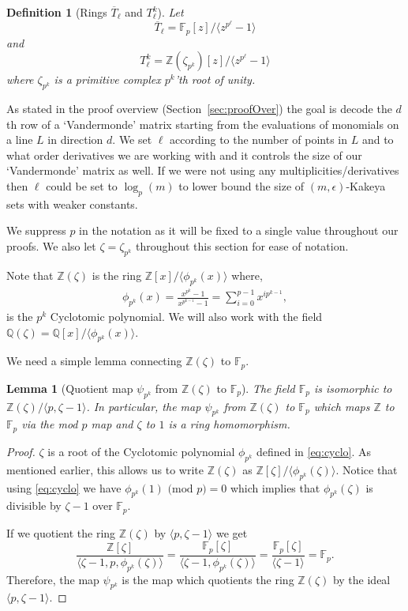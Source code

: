 \documentclass[11pt]{article}
\numberwithin{equation}{section}
\newtheorem{lem}[thm]{Lemma}
\newtheorem{define}[thm]{Definition}
\def\F{{\mathbb{F}}}
\def\Q{{\mathbb{Q}}}
\def\Z{{\mathbb{Z}}}
\begin{document}
\begin{define}[Rings $\overline{T}_{\ell}$ and $T_{\ell}^k$]
Let 
$$\overline{T}_{\ell}=\F_p[z]/\langle z^{p^\ell}-1\rangle$$ 
and 
$$T_{\ell}^k=\Z(\zeta_{p^k})[z]/\langle z^{p^\ell} -1\rangle$$
where $\zeta_{p^k}$ is a primitive complex $p^k$'th root of unity.
\end{define}

As stated in the proof overview (Section~\ref{sec:proofOver}) the goal is decode the $d$th row of a `Vandermonde' matrix starting from the evaluations of monomials on a line $L$ in direction $d$. We set $\ell$ according to the number of points in $L$ and to what order derivatives we are working with and it controls the size of our `Vandermonde' matrix as well. If we were not using any multiplicities/derivatives then $\ell$ could be set to $\log_p(m)$ to lower bound the size of $(m,\epsilon)$-Kakeya sets with weaker constants.

We suppress $p$ in the notation as it will be fixed to a single value throughout our proofs. We also let $\zeta=\zeta_{p^k}$ throughout this section for ease of notation.

Note that $\Z(\zeta)$ is the ring $\Z[x]/\langle \phi_{p^k}(x)\rangle$ where,
\begin{align}
    \phi_{p^k}(x)=\frac{x^{p^k}-1}{x^{p^{k-1}}-1}=\sum\limits_{i=0}^{p-1} x^{ip^{k-1}}\label{eq:cyclo},
\end{align}
is the $p^k$ Cyclotomic polynomial. We will also work with the field $\Q(\zeta)=\Q[x]/\langle \phi_{p^k}(x)\rangle$. 

We need a simple lemma connecting $\Z(\zeta)$ to $\F_p$.

\begin{lem}[Quotient map $\psi_{p^k}$ from $\Z(\zeta)$ to $\F_p$]
The field $\F_p$ is isomorphic to $\Z(\zeta)/\langle p,\zeta-1\rangle$. In particular, the map $\psi_{p^k}$ from $\Z(\zeta)$ to $\F_p$ which maps $\Z$ to $\F_p$ via the mod $p$ map and $\zeta$ to $1$ is a ring homomorphism.
\end{lem}
\begin{proof}
$\zeta$ is a root of the Cyclotomic polynomial $\phi_{p^k}$ defined in \eqref{eq:cyclo}.
As mentioned earlier, this allows us to write $\Z(\zeta)$ as $\Z[\zeta]/\langle \phi_{p^k}(\zeta)\rangle$. Notice that using \eqref{eq:cyclo} we have $\phi_{p^k}(1)\text{ (mod }p\text{)}=0 $ which implies that $\phi_{p^k}(\zeta)$ is divisible by $\zeta-1$ over $\F_p$.

If we quotient the ring $\Z(\zeta)$ by $\langle p,\zeta-1\rangle$ we get 
$$\frac{\Z[\zeta]}{\langle \zeta-1,p, \phi_{p^k}(\zeta)\rangle}=\frac{\F_p[\zeta]}{\langle \zeta-1, \phi_{p^k}(\zeta)\rangle}=\frac{\F_p[\zeta]}{\langle \zeta-1\rangle}=\F_p.$$
Therefore, the map $\psi_{p^k}$ is the map which quotients the ring $\Z(\zeta)$ by the ideal $\langle p, \zeta-1 \rangle$.
\end{proof}
\end{document}
